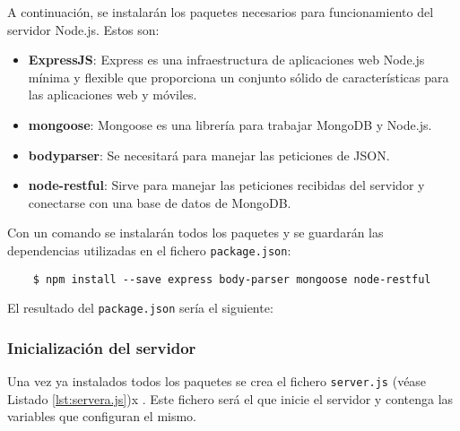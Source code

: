 A continuación, se instalarán los paquetes necesarios para funcionamiento del servidor Node.js. Estos son:

\begin{itemize}
    \item \textbf{ExpressJS}: Express es una infraestructura de aplicaciones web Node.js mínima y flexible que proporciona un conjunto sólido de características para las aplicaciones web y móviles.
    \item \textbf{mongoose}: Mongoose es una librería para trabajar MongoDB y Node.js.
    \item \textbf{bodyparser}: Se necesitará para manejar las peticiones de JSON.
    \item \textbf{node-restful}: Sirve para manejar las peticiones recibidas del servidor y conectarse con una base de datos de MongoDB.
\end{itemize}

Con un comando se instalarán todos los paquetes y se guardarán las dependencias utilizadas en el fichero \texttt{package.json}:

\begin{lstlisting}
    $ npm install --save express body-parser mongoose node-restful
\end{lstlisting}

El resultado del \texttt{package.json} sería el siguiente:


\subsubsection{Inicialización del servidor}

Una vez ya instalados todos los paquetes se crea el fichero \texttt{server.js} (véase Listado \ref{lst:servera.js})x    . Este fichero será el que inicie el servidor y contenga las variables que configuran el mismo. 


